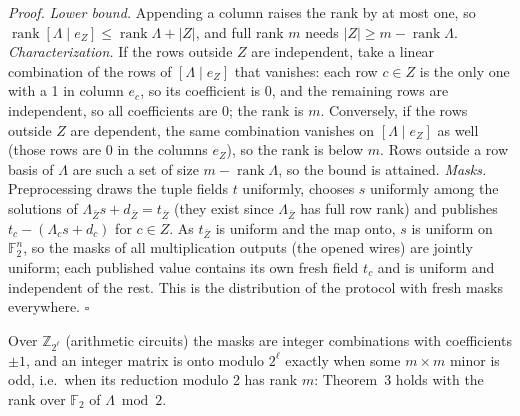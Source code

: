 \emph{Proof.} \emph{Lower bound.} Appending a column raises the rank by at most one, so
$\operatorname{rank}[\Lambda \mid e_Z] \le \operatorname{rank}\Lambda + |Z|$, and full rank $m$ needs
$|Z| \ge m - \operatorname{rank}\Lambda$. \emph{Characterization.} If the rows outside $Z$ are independent, take a
linear combination of the rows of $[\Lambda \mid e_Z]$ that vanishes: each row $c \in Z$ is the only one with a 1 in
column $e_c$, so its coefficient is 0, and the remaining rows are independent, so all coefficients are 0; the rank is
$m$. Conversely, if the rows outside $Z$ are dependent, the same combination vanishes on $[\Lambda \mid e_Z]$ as well
(those rows are 0 in the columns $e_Z$), so the rank is below $m$. Rows outside a row basis of $\Lambda$ are such a set
of size $m - \operatorname{rank}\Lambda$, so the bound is attained. \emph{Masks.} Preprocessing draws the tuple fields
$t$ uniformly, chooses $s$ uniformly among the solutions of $\Lambda_{\bar Z} s + d_{\bar Z} = t_{\bar Z}$ (they exist
since $\Lambda_{\bar Z}$ has full row rank) and publishes $t_c - (\Lambda_c s + d_c)$ for $c \in Z$. As $t_{\bar Z}$ is
uniform and the map onto, $s$ is uniform on $\mathbb{F}_2^n$, so the masks of all multiplication outputs (the opened
wires) are jointly uniform; each published value contains its own fresh field $t_c$ and is uniform and independent of
the rest. This is the distribution of the protocol with fresh masks everywhere. \hfill$\square$

Over $\mathbb{Z}_{2^\ell}$ (arithmetic circuits) the masks are integer combinations with coefficients $\pm1$, and an
integer matrix is onto modulo $2^\ell$ exactly when some $m \times m$ minor is odd, i.e.\ when its reduction modulo 2
has rank $m$: Theorem~3 holds with the rank over $\mathbb{F}_2$ of $\Lambda \bmod 2$.


